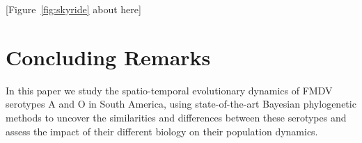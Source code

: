\documentclass[10pt]{article}
\begin{document}
\begin{center}
 [Figure~\ref{fig:skyride} about here]
\end{center}

\section*{Concluding Remarks}

In this paper we study the spatio-temporal evolutionary dynamics of FMDV serotypes A and O in South America, using state-of-the-art Bayesian phylogenetic methods to uncover the similarities and differences between these serotypes and assess the impact of their different biology on their population dynamics.


\end{document}
